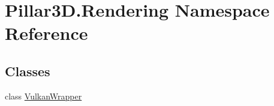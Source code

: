 \hypertarget{namespace_pillar3_d_1_1_rendering}{}\section{Pillar3\+D.\+Rendering Namespace Reference}
\label{namespace_pillar3_d_1_1_rendering}
\subsection*{Classes}
\begin{DoxyCompactItemize}
\item 
class \hyperlink{class_pillar3_d_1_1_rendering_1_1_vulkan_wrapper}{Vulkan\+Wrapper}
\end{DoxyCompactItemize}
